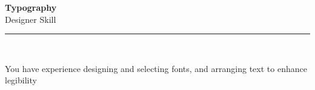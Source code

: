 \documentclass[11pt,a4paper]{memoir}
\begin{document}
    \begin{Spacing}{0.75}%
        \noindent
        \Large
        \textbf{Typography}\\[3pt]
        \scriptsize\color{gray}Designer Skill\\ 
        \rule{\textwidth}{.3mm}\\
        
        \vspace{3mm}
        \noindent
        \begin{minipage}[t]{53mm}
            \begin{flushleft}
            {
                \normalsize
                \begin{Spacing}{1}%
                \color{black}\textrm{You have experience designing and selecting fonts, and arranging text to enhance legibility}\\
                \end{Spacing}
            }
            \end{flushleft}
        \end{minipage}

        \vspace{5mm}
        \noindent
        \begin{minipage}[t]{53mm}
            \begin{flushleft}
            {
                \normalsize
                \begin{Spacing}{1}%
                \color{gray}\textit{}\\
                \end{Spacing}
            }
            \end{flushleft}
        \end{minipage}
    \end{Spacing}
    \clearpage
\end{document}
